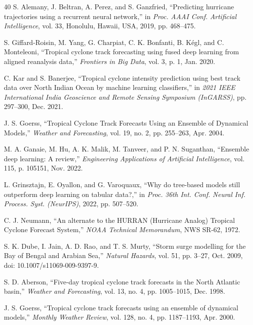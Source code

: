\documentclass[conference]{IEEEtran}
\begin{document}
\begin{thebibliography}{40}
S. Alemany, J. Beltran, A. Perez, and S. Ganzfried, ``Predicting hurricane trajectories using a recurrent neural network,'' in \textit{Proc. AAAI Conf. Artificial Intelligence}, vol. 33, Honolulu, Hawaii, USA, 2019, pp. 468--475.

S. Giffard-Roisin, M. Yang, G. Charpiat, C. K. Bonfanti, B. K\'{e}gl, and C. Monteleoni, ``Tropical cyclone track forecasting using fused deep learning from aligned reanalysis data,'' \textit{Frontiers in Big Data}, vol. 3, p. 1, Jan. 2020.

C. Kar and S. Banerjee, ``Tropical cyclone intensity prediction using best track data over North Indian Ocean by machine learning classifiers,'' in \textit{2021 IEEE International India Geoscience and Remote Sensing Symposium (InGARSS)}, pp. 297--300, Dec. 2021.

J. S. Goerss, ``Tropical Cyclone Track Forecasts Using an Ensemble of Dynamical Models,'' \textit{Weather and Forecasting}, vol. 19, no. 2, pp. 255--263, Apr. 2004.

M. A. Ganaie, M. Hu, A. K. Malik, M. Tanveer, and P. N. Suganthan, ``Ensemble deep learning: A review,'' \textit{Engineering Applications of Artificial Intelligence}, vol. 115, p. 105151, Nov. 2022.

L. Grinsztajn, E. Oyallon, and G. Varoquaux, ``Why do tree-based models still outperform deep learning on tabular data?,'' in \textit{Proc. 36th Int. Conf. Neural Inf. Process. Syst. (NeurIPS)}, 2022, pp. 507--520.

C. J. Neumann, ``An alternate to the HURRAN (Hurricane Analog) Tropical Cyclone Forecast System,'' \textit{NOAA Technical Memorandum}, NWS SR-62, 1972.

S. K. Dube, I. Jain, A. D. Rao, and T. S. Murty, ``Storm surge modelling for the Bay of Bengal and Arabian Sea,'' \textit{Natural Hazards}, vol. 51, pp. 3--27, Oct. 2009, doi: 10.1007/s11069-009-9397-9.

S. D. Aberson, ``Five-day tropical cyclone track forecasts in the North Atlantic basin,'' \textit{Weather and Forecasting}, vol. 13, no. 4, pp. 1005--1015, Dec. 1998.

J. S. Goerss, ``Tropical cyclone track forecasts using an ensemble of dynamical models,'' \textit{Monthly Weather Review}, vol. 128, no. 4, pp. 1187--1193, Apr. 2000.


\end{thebibliography}
\end{document}
